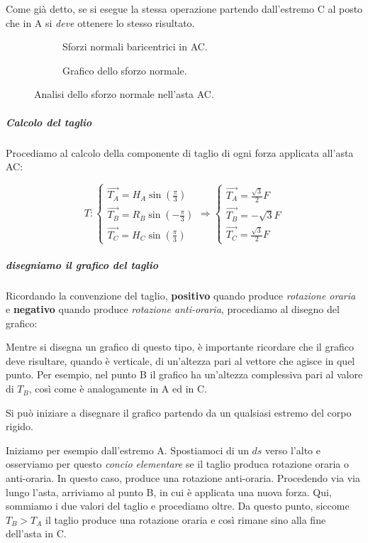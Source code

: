 \documentclass[main.tex]{subfiles}
\begin{document}
Come già detto, se si esegue la stessa operazione partendo dall'estremo C al posto che in A si \textit{deve} ottenere lo stesso risultato.

\begin{figure}[!tbp]
  \begin{subfigure}[b]{.5\textwidth}
  \centering
  \resizebox{.5\textwidth}{!}{}
  \caption{Sforzi normali baricentrici in AC.}
  \end{subfigure}
  \hfill
  \begin{subfigure}[b]{.5\textwidth}
  \centering
  \resizebox{.5\textwidth}{!}{}
  \caption{Grafico dello sforzo normale.}
  \end{subfigure}
  \caption{Analisi dello sforzo normale nell'asta AC.}
\end{figure}

\subparagraph{Calcolo del taglio}
Procediamo al calcolo della componente di taglio di ogni forza applicata all'asta AC:

\[
	T: \begin{cases}
		\vec{T_A} = H_A\sin(\frac{\pi}{3})\\
		\vec{T_B} = R_B\sin(-\frac{\pi}{3})\\
		\vec{T_C} = H_C\sin(\frac{\pi}{3})
	\end{cases}
	\Longrightarrow
	\begin{cases}
		\vec{T_A} = \frac{\sqrt{3}}{2}F\\
		\vec{T_B} = -\sqrt{3}F\\
		\vec{T_C} = \frac{\sqrt{3}}{2}F
	\end{cases}
\]

\subparagraph{disegniamo il grafico del taglio}
Ricordando la convenzione del taglio, \textbf{positivo} quando produce \textit{rotazione oraria} e \textbf{negativo} quando produce \textit{rotazione anti-oraria},  procediamo al disegno del grafico:

Mentre si disegna un grafico di questo tipo, è importante ricordare che il grafico deve risultare, quando è verticale, di un'altezza pari al vettore che agisce in quel punto. Per esempio, nel punto B il grafico ha un'altezza complessiva pari al valore di $T_B$, così come è analogamente in A ed in C.

Si può iniziare a disegnare il grafico partendo da un qualsiasi estremo del corpo rigido.

Iniziamo per esempio dall'estremo A. Spostiamoci di un $ds$ verso l'alto e osserviamo per questo \textit{concio elementare} se il taglio produca rotazione oraria o anti-oraria. In questo caso, produce una rotazione anti-oraria. Procedendo via via lungo l'asta, arriviamo al punto B, in cui è applicata una nuova forza. Qui, sommiamo i due valori del taglio e procediamo oltre. Da questo punto, siccome $T_B>T_A$ il taglio produce una rotazione oraria e così rimane sino alla fine dell'asta in C.
\end{document}

